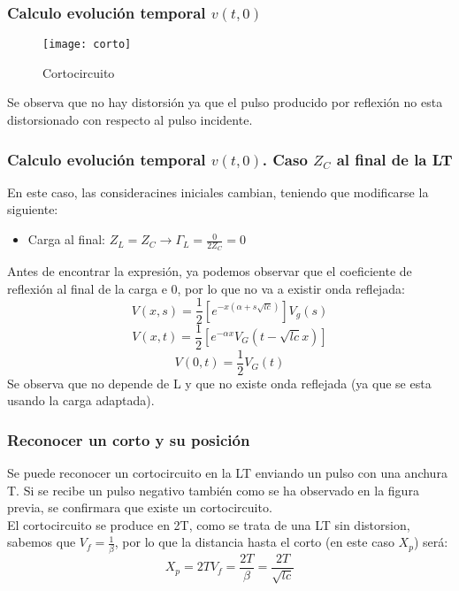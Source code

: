 \documentclass[12pt]{article}
\begin{document}
\subsubsection{Calculo evolución temporal $v(t,0)$}
\begin{figure}[H]
  \centering
    \texttt{[image: corto]}
  \caption{Cortocircuito}
  \label{fig:corto}
\end{figure}
Se observa que no hay distorsión ya que el pulso producido por reflexión no esta distorsionado con respecto al pulso incidente.
\subsubsection{Calculo evolución temporal $v(t,0)$. Caso ${Z}_{C}$ al final de la LT}
En este caso, las consideracines iniciales cambian, teniendo que modificarse la siguiente:
\begin{itemize}
	\item Carga al final: ${Z}_{L} =  {Z}_{C} \rightarrow {\Gamma}_{L}=\frac{0}{2{Z}_{C}}=0$
\end{itemize}
Antes de encontrar la expresión, ya podemos observar que el coeficiente de reflexión al final de la carga e 0, por lo que no va a existir onda reflejada:
\begin{displaymath}
V(x,s)= \frac{1}{2}[{e}^{-x(\alpha + s\sqrt{lc})}]{V}_{g}(s)
\end{displaymath}
\begin{displaymath}
V(x,t)= \frac{1}{2}[{e}^{-\alpha x}{V}_{G}(t-\sqrt{lc}x)]
\end{displaymath}
\begin{displaymath}
V(0,t)= \frac{1}{2}{V}_{G}(t)
\end{displaymath}
Se observa que no depende de L y que no existe onda reflejada (ya que se esta usando la carga adaptada).
\subsubsection{Reconocer un corto y su posición}
Se puede reconocer un cortocircuito en la LT enviando un pulso con una anchura T. Si se recibe un pulso negativo también como se ha observado en la figura previa, se confirmara que existe un cortocircuito.\\
El cortocircuito se produce en 2T, como se trata de una LT sin distorsion, sabemos que ${V}_{f}=\frac{1}{\beta}$, por lo que la distancia hasta el corto (en este caso ${X}_{p}$) será: 
\begin{displaymath}
{X}_{p} = 2T{V}_{f} = \frac{2T}{\beta}=\frac{2T}{\sqrt{lc}}
\end{displaymath}
\end{document}

